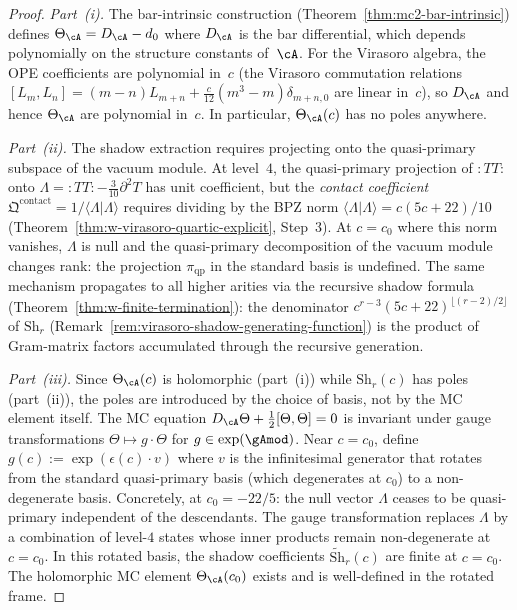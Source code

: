 \begin{proof}
\emph{Part~\textup{(i)}.}\;
The bar-intrinsic construction
(Theorem~\ref{thm:mc2-bar-intrinsic}) defines $\Theta_\cA = D_\cA - d_0$
where $D_\cA$ is the bar differential, which depends polynomially on
the structure constants of~$\cA$.  For the Virasoro algebra, the OPE
coefficients are polynomial in~$c$ (the Virasoro commutation relations
$[L_m, L_n] = (m-n)L_{m+n} + \frac{c}{12}(m^3-m)\delta_{m+n,0}$
are linear in~$c$), so $D_\cA$ and hence $\Theta_\cA$ are polynomial
in~$c$.  In particular, $\Theta_\cA(c)$ has no poles anywhere.

\smallskip\noindent
\emph{Part~\textup{(ii)}.}\;
The shadow extraction requires projecting onto the quasi-primary
subspace of the vacuum module.  At level~$4$, the quasi-primary
projection of ${:}TT{:}$ onto $\Lambda = {:}TT{:} - \tfrac{3}{10}\partial^2 T$
has unit coefficient, but the \emph{contact coefficient}
$\mathfrak{Q}^{\mathrm{contact}} = 1/\langle\Lambda|\Lambda\rangle$
requires dividing by the BPZ norm
$\langle\Lambda|\Lambda\rangle = c(5c+22)/10$
(Theorem~\ref{thm:w-virasoro-quartic-explicit}, Step~3).
At $c = c_0$ where this norm vanishes, $\Lambda$ is null and the
quasi-primary decomposition of the vacuum module changes rank:
the projection $\pi_{\mathrm{qp}}$ in the standard basis is
undefined.  The same mechanism propagates to all higher arities
via the recursive shadow formula
(Theorem~\ref{thm:w-finite-termination}): the denominator
$c^{r-3}(5c+22)^{\lfloor (r-2)/2\rfloor}$ of $\mathrm{Sh}_r$
(Remark~\ref{rem:virasoro-shadow-generating-function})
is the product of Gram-matrix factors accumulated through the
recursive generation.

\smallskip\noindent
\emph{Part~\textup{(iii)}.}\;
Since $\Theta_\cA(c)$ is holomorphic (part~(i)) while
$\mathrm{Sh}_r(c)$ has poles (part~(ii)), the poles are introduced
by the choice of basis, not by the MC element itself.
The MC equation
$D_\cA \Theta + \tfrac{1}{2}[\Theta,\Theta] = 0$
is invariant under gauge transformations
$\Theta \mapsto g \cdot \Theta$ for
$g \in \exp(\gAmod)$.  Near $c = c_0$, define
$g(c) := \exp(\epsilon(c) \cdot v)$ where $v$ is the
infinitesimal generator that rotates from the standard
quasi-primary basis (which degenerates at $c_0$) to a
non-degenerate basis.  Concretely, at $c_0 = -22/5$:
the null vector $\Lambda$ ceases to be quasi-primary independent
of the descendants.  The gauge transformation
replaces $\Lambda$ by a combination of level-$4$ states
whose inner products remain non-degenerate at $c = c_0$.
In this rotated basis, the shadow coefficients
$\widetilde{\mathrm{Sh}}_r(c)$ are finite at $c = c_0$.
The holomorphic MC element $\Theta_\cA(c_0)$ exists
and is well-defined in the rotated frame.
\end{proof}

